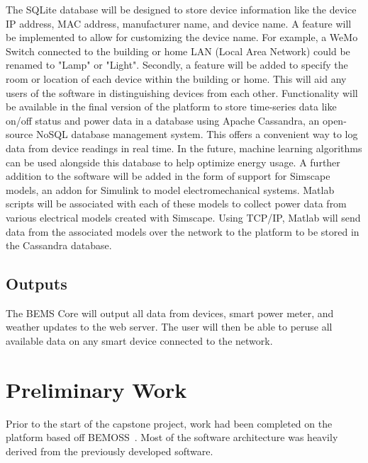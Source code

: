 \documentclass[letterpaper,12pt]{article}   %
\begin{document}
\medbreak\noindent
The SQLite database will be designed to store device information like the device IP address, MAC address, manufacturer name, and device name. A feature will be implemented to allow for customizing the device name. For example, a WeMo Switch connected to the building or home LAN (Local Area Network) could be renamed to "Lamp" or "Light". Secondly, a feature will be added to specify the room or location of each device within the building or home. This will aid any users of the software in distinguishing devices from each other. 
\medbreak\noindent
Functionality will be available in the final version of the platform to store time-series data like on/off status and power data in a database using Apache Cassandra, an open-source NoSQL database management system. This offers a convenient way to log data from device readings in real time. In the future, machine learning algorithms can be used alongside this database to help optimize energy usage.
\medbreak\noindent
A further addition to the software will be added in the form of support for Simscape models, an addon for Simulink to model electromechanical systems. Matlab scripts will be associated with each of these models to collect power data from various electrical models created with Simscape. Using TCP/IP, Matlab will send data from the associated models over the network to the platform to be stored in the Cassandra database.

\subsection{Outputs}
The BEMS Core will output all data from devices, smart power meter, and weather updates to the web server. The user will then be able to peruse all available data on any smart device connected to the network.


\section{Preliminary Work}
Prior to the start of the capstone project, work had been completed on the platform based off BEMOSS~\cite{BEMOSS}. Most of the software architecture was heavily derived from the previously developed software.

\end{document}

